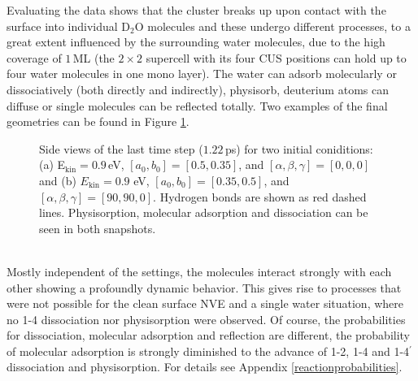 \documentclass[11pt,DIV=13,BCOR=5mm,a4paper,headinclude]{scrbook}
\begin{document}
Evaluating the data shows that the cluster breaks up upon contact with the surface into individual D$_2$O molecules and these undergo different processes, to a great extent influenced by the surrounding water molecules, due to the high coverage of $1\,$ML (the $2\times 2$ supercell with its four CUS positions can hold up to four water molecules in one mono layer).
The water can adsorb molecularly or dissociatively (both directly and indirectly), physisorb, deuterium atoms can diffuse or single molecules can be reflected totally.
Two examples of the final geometries can be found in Figure \ref{abb:tetramer_traj}.
\begin{figure}[!ht]
\centering
{} 
\quad
{}
\caption{Side views of the last time step ($1.22\,$ps) for two initial coniditions: (a) E$_\textrm{kin}=0.9\,$eV, $[a_0,b_0]=[0.5,0.35]$, and $[\alpha,\beta,\gamma]=[0,0,0]$ and (b)  $E_\textrm{kin}=0.9$ eV, $[a_0,b_0]=[0.35,0.5]$, 
 and $[\alpha,\beta,\gamma]=[90,90,0]$.
Hydrogen bonds are shown as red dashed lines.
Physisorption, molecular adsorption and dissociation can be seen in both snapshots.}
\label{abb:tetramer_traj}
\end{figure}
\\
Mostly independent of the settings, the molecules interact strongly with each other showing a profoundly dynamic behavior.
This gives rise to processes that were not possible for the clean surface NVE and a single water situation, where no 1-4 dissociation nor physisorption were observed.
Of course, the probabilities for dissociation, molecular adsorption and reflection are different, the probability of molecular adsorption is strongly diminished to the advance of 1-2, 1-4 and 1-4$^\prime$ dissociation and physisorption.
For details see Appendix \ref{reactionprobabilities}.
\end{document}
